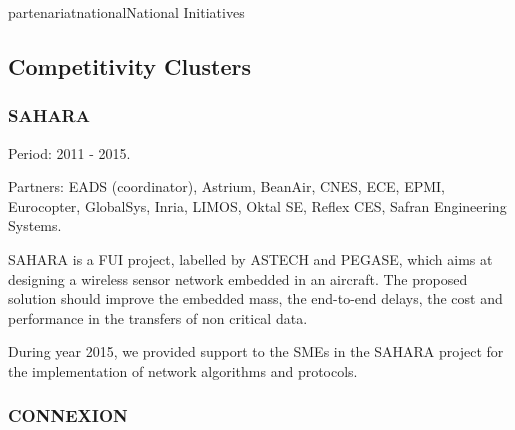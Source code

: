 \documentclass{ra2016}
\begin{document}
\begin{module}{partenariat}{national}{National Initiatives}


\subsection{Competitivity Clusters}

\subsubsection{SAHARA}

\begin{participants}
\end{participants}

Period: 2011 - 2015.

Partners: EADS (coordinator), Astrium, BeanAir, CNES, ECE, EPMI, Eurocopter, GlobalSys, Inria, LIMOS, Oktal SE, Reflex CES, Safran Engineering Systems.

SAHARA is a FUI project, labelled by ASTECH and PEGASE, which aims at designing a wireless sensor network embedded in an aircraft. The proposed solution should improve the embedded mass, the end-to-end delays, the cost and performance in the transfers of non critical data. 

During year 2015, we provided support to the SMEs in the SAHARA project for the implementation of network algorithms and protocols. 

\subsubsection{CONNEXION}

\begin{participants}
\end{participants}


\end{module}
\end{document}
